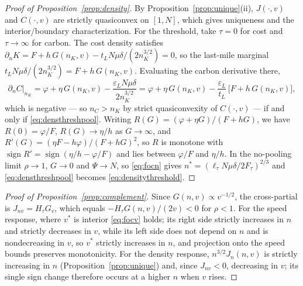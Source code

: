 \documentclass[11pt]{article}
\theoremstyle{definition}
\theoremstyle{remark}
\theoremstyle{plain}
\begin{document}
\begin{proof}[Proof of Proposition~\ref{prop:density}]
By Proposition~\ref{prop:unique}(ii), $J(\cdot,v)$ and $C(\cdot,v)$ are strictly quasiconvex on $[1,N]$, which
gives uniqueness and the interior/boundary characterization. For the threshold, take $\tau=0$ for cost and
$\tau\to\infty$ for carbon. The cost density satisfies $\partial_n K=F+h\,G(n_K,v)-
t_L N\mu\delta/(2n_K^{3/2})=0$, so the last-mile marginal $t_L N\mu\delta/(2n_K^{3/2})=F+h\,G(n_K,v)$.
Evaluating the carbon derivative there,
\[
  \partial_n C\big|_{n_K}
  =\varphi+\eta\,G(n_K,v)-\frac{\varepsilon_L N\mu\delta}{2n_K^{3/2}}
  =\varphi+\eta\,G(n_K,v)-\frac{\varepsilon_L}{t_L}\,\big[F+h\,G(n_K,v)\big],
\]
which is negative --- so $n_C>n_K$ by strict quasiconvexity of $C(\cdot,v)$ --- if and only if
\eqref{eq:densthreshpool}. Writing
$R(G)=(\varphi+\eta G)/(F+hG)$, we have $R(0)=\varphi/F$, $R(G)\to\eta/h$ as $G\to\infty$, and
$R'(G)=(\eta F-h\varphi)/(F+hG)^2$, so $R$ is monotone with $\operatorname{sign}R'=\operatorname{sign}
(\eta/h-\varphi/F)$ and lies between $\varphi/F$ and $\eta/h$. In the no-pooling limit $\rho\to1$, $G\to0$ and $\Psi\to N$, so
\eqref{eq:focn} gives $n^*=(\ell_\tau N\mu\delta/2F_\tau)^{2/3}$ and \eqref{eq:densthreshpool} becomes \eqref{eq:densitythreshold}.
\end{proof}

\begin{proof}[Proof of Proposition~\ref{prop:complement}]
Since $G(n,v)\propto v^{-1/2}$, the cross-partial is $J_{nv}=H_\tau G_v$, which equals
$-H_\tau G(n,v)/(2v)<0$ for $\rho<1$. For the speed response, where $v^*$ is interior \eqref{eq:focv} holds; its right side strictly
increases in $n$ and strictly decreases in $v$, while its left side does not depend on $n$ and is nondecreasing
in $v$, so $v^*$ strictly increases in $n$, and projection onto the speed bounds preserves monotonicity. For the density response, $n^{3/2}J_n(n,v)$ is strictly increasing in $n$
(Proposition~\ref{prop:unique}) and, since $J_{nv}<0$, decreasing in $v$; its single sign change therefore
occurs at a higher $n$ when $v$ rises.
\end{proof}
\end{document}
